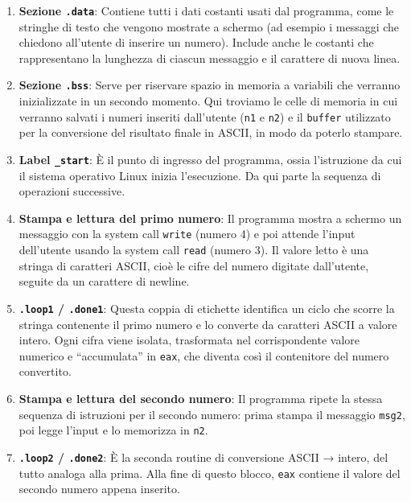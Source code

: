 \documentclass[a4paper,12pt]{article}
\begin{document}
	\begin{enumerate}
		\item \textbf{Sezione \texttt{.data}}:  
		Contiene tutti i dati costanti usati dal programma, come le stringhe di testo che vengono mostrate a schermo (ad esempio i messaggi che chiedono all’utente di inserire un numero).  
		Include anche le costanti che rappresentano la lunghezza di ciascun messaggio e il carattere di nuova linea.  
		
		\item \textbf{Sezione \texttt{.bss}}:  
		Serve per riservare spazio in memoria a variabili che verranno inizializzate in un secondo momento.  
		Qui troviamo le celle di memoria in cui verranno salvati i numeri inseriti dall’utente (\texttt{n1} e \texttt{n2}) e il \texttt{buffer} utilizzato per la conversione del risultato finale in ASCII, in modo da poterlo stampare.  
		
		\item \textbf{Label \texttt{\_start}}:  
		È il punto di ingresso del programma, ossia l’istruzione da cui il sistema operativo Linux inizia l’esecuzione. Da qui parte la sequenza di operazioni successive.  
		
		\item \textbf{Stampa e lettura del primo numero}:  
		Il programma mostra a schermo un messaggio con la system call \texttt{write} (numero 4) e poi attende l’input dell’utente usando la system call \texttt{read} (numero 3).  
		Il valore letto è una stringa di caratteri ASCII, cioè le cifre del numero digitate dall’utente, seguite da un carattere di newline.  
		
		\item \textbf{\texttt{.loop1} / \texttt{.done1}}:  
		Questa coppia di etichette identifica un ciclo che scorre la stringa contenente il primo numero e lo converte da caratteri ASCII a valore intero.  
		Ogni cifra viene isolata, trasformata nel corrispondente valore numerico e “accumulata” in \texttt{eax}, che diventa così il contenitore del numero convertito.  
		
		\item \textbf{Stampa e lettura del secondo numero}:  
		Il programma ripete la stessa sequenza di istruzioni per il secondo numero: prima stampa il messaggio \texttt{msg2}, poi legge l’input e lo memorizza in \texttt{n2}.  
		
		\item \textbf{\texttt{.loop2} / \texttt{.done2}}:  
		È la seconda routine di conversione ASCII → intero, del tutto analoga alla prima.  
		Alla fine di questo blocco, \texttt{eax} contiene il valore del secondo numero appena inserito.  
		

\end{enumerate}
\end{document}
